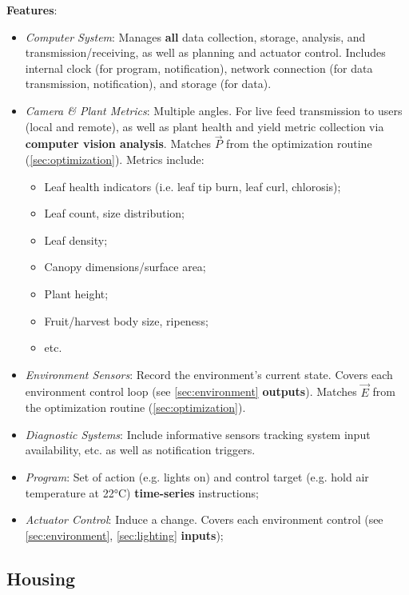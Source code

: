 \documentclass{report}
\begin{document}
\textbf{Features}:
\begin{itemize}
    \item \textit{Computer System}: Manages \textbf{all} data collection, storage, analysis, and transmission/receiving, as well as planning and actuator control. Includes internal clock (for program, notification), network connection (for data transmission, notification), and storage (for data). 
    \item \textit{Camera \& Plant Metrics}: Multiple angles. For live feed transmission to users (local and remote), as well as plant health and yield metric collection via \textbf{computer vision analysis}. Matches $\vec P$ from the optimization routine (\ref{sec:optimization}). Metrics include:
    \begin{itemize}
        \item Leaf health indicators (i.e. leaf tip burn, leaf curl, chlorosis);
        \item Leaf count, size distribution;
        \item Leaf density;
        \item Canopy dimensions/surface area;
        \item Plant height;
        \item Fruit/harvest body size, ripeness;
        \item etc.
    \end{itemize}
    \item \textit{Environment Sensors}: Record the environment's current state. Covers each environment control loop (see \ref{sec:environment} \textbf{outputs}). Matches $\vec E$ from the optimization routine (\ref{sec:optimization}).
\newpage
    \item \textit{Diagnostic Systems}: Include informative sensors tracking system input availability, etc. as well as notification triggers.
    \item \textit{Program}: Set of action (e.g. lights on) and control target (e.g. hold air temperature at 22°C) \textbf{time-series} instructions;
    \item \textit{Actuator Control}: Induce a change. Covers each environment control (see \ref{sec:environment}, \ref{sec:lighting} \textbf{inputs});
\end{itemize}

\vspace{1cm}

\subsection{Housing}
\label{sec:housing}
\end{document}
